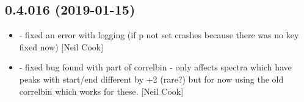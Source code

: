 \documentclass[a4paper,10pt,english]{report}
\begin{document}
\subsection{0.4.016 (2019-01-15)}
\label{\detokenize{misc/changelog:id217}}\begin{itemize}
\item {} 
 - fixed an error with logging (if p not set crashes
because there was no  key \textendash{} fixed now) {[}Neil Cook{]}

\item {} 
 - fixed bug found with part of correlbin - only affects
spectra which have peaks with start/end different by +2 (rare?) but
for now using the old correlbin which works for these. {[}Neil Cook{]}

\end{itemize}
\end{document}
